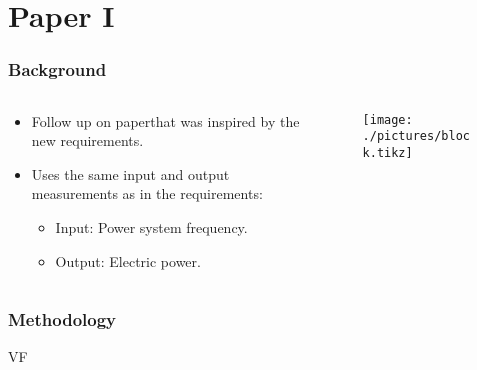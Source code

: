 \section{Paper I}
\begin{frame}
	\frametitle{Background}
	\begin{columns}
		\begin{column}{0.4\textwidth}
			\begin{itemize}
					\item Follow up on paper\footnotemark[1] that was inspired by the new requirements.
					\item Uses the same input and output measurements as in the requirements:
					\begin{itemize}
							\item Input: Power system frequency.
							\item Output: Electric power.
					\end{itemize}
			\end{itemize}
	\end{column}
	\begin{column}{0.6\textwidth}
			\begin{figure}
					\texttt{[image: ./pictures/block.tikz]}
			\end{figure}
	\end{column}
	\end{columns}
\end{frame}
\begin{frame}
	\frametitle{Methodology}
	VF
\end{frame}
		

